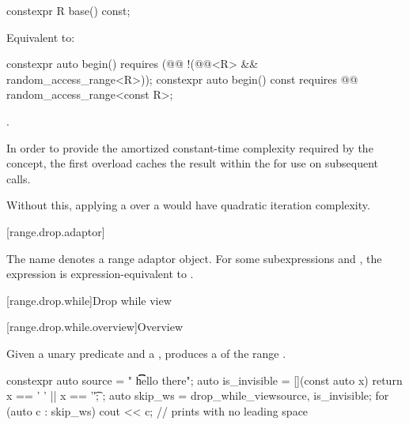 \documentclass{wg21}
\begin{document}
%
\begin{itemdecl}
constexpr R base() const;
\end{itemdecl}

\begin{itemdescr}
\pnum
\effects
Equivalent to: 
\end{itemdescr}

%
\begin{itemdecl}
constexpr auto begin()
requires (@@ !(@@<R> && random_access_range<R>));
constexpr auto begin() const
requires @@ random_access_range<const R>;
\end{itemdecl}

\begin{itemdescr}
\pnum
\returns
{}.

\pnum
\remarks
In order to provide the amortized constant-time complexity required
by the  concept,
the first overload caches the result within the 
for use on subsequent calls.
\begin{note}
	Without this,
	applying a  over a 
	would have quadratic iteration complexity.
\end{note}
\end{itemdescr}

[range.drop.adaptor]{}

\pnum
The name  denotes
a range adaptor object.
For some subexpressions  and ,
the expression 
is expression-equivalent to .

[range.drop.while]{Drop while view}

[range.drop.while.overview]{Overview}

\pnum
Given a unary predicate  and a  ,
 produces a 
of the range .

\pnum
\begin{example}
\begin{codeblock}
	constexpr auto source = "  \t   \t   \t   hello there";
	auto is_invisible = [](const auto x) { return x == ' ' || x == '\t'; };
	auto skip_ws = drop_while_view{source, is_invisible};
	for (auto c : skip_ws) {
		cout << c;                                    // prints  with no leading space
	}
\end{codeblock}
\end{example}
\end{document}
